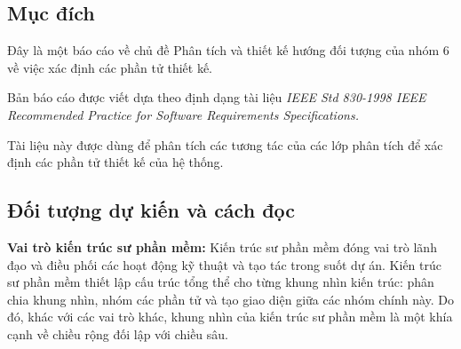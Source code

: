 \documentclass[./../main_file.tex]{subfiles}
\begin{document}
	\subsection{Mục đích}
	
	Đây là một báo cáo về chủ đề Phân tích và thiết kế hướng đối tượng của nhóm 6 về việc xác định các phần tử thiết kế.
	
	
	Bản báo cáo được viết dựa theo định dạng tài liệu \textit{IEEE Std 830-1998 IEEE Recommended Practice for Software Requirements Specifications. }
	
	
	Tài liệu này được dùng để phân tích các tương tác của các lớp phân tích để xác định các phần tử thiết kế của hệ thống.
	
	\subsection{Đối tượng dự kiến và cách đọc }
	\textbf{Vai trò kiến trúc sư phần mềm:} Kiến trúc sư phần mềm đóng vai trò lãnh đạo và điều phối các hoạt động kỹ thuật và tạo tác trong suốt dự án. Kiến trúc sư phần mềm thiết lập cấu trúc tổng thể cho từng khung nhìn kiến trúc: phân chia khung nhìn, nhóm các phần tử và tạo giao diện giữa các nhóm chính này. Do đó, khác với các vai trò khác, khung nhìn của kiến trúc sư phần mềm là một khía cạnh về chiều rộng đối lập với chiều sâu.
	
\end{document}
